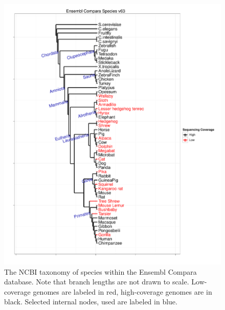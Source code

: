 \begin{figure}[h]
\centering
\includegraphics[scale=0.4]{Figs/compara_63_tree.pdf}
\caption{The NCBI taxonomy of species within the Ensembl Compara
  database. Note that branch lengths are not drawn to
  scale. Low-coverage genomes are labeled in red, high-coverage
  genomes are in black. Selected internal nodes, used are labeled in
  blue.}
\label{ncbi_tree}
\end{figure}


